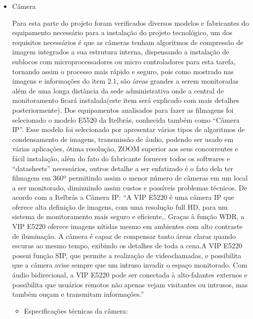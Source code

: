 \begin{itemize}
	\item Câmera
	
	Para esta parte do projeto foram verificados diversos modelos e fabricantes do equipamento necessário para a instalação do projeto tecnológico, um dos requisitos necessários é que as câmeras tenham algoritmos de compressão de imagem integrados a sua estrutura interna, dispensando a instalação de sublocos com microprocessadores ou micro controladores para esta tarefa, tornando assim o processo mais rápido e seguro, pois como  mostrado  nas imagens e informações do item 2.1, são áreas grandes a serem monitoradas além de uma longa distância da sede administrativa onde a central de monitoramento ficará instalada(este item será explicado com mais detalhes posteriormente). Dos equipamentos analisados para fazer as filmagens foi selecionado o modelo E5520 da Itelbrás, conhecida também como “Câmera IP”. Esse modelo foi selecionado  por apresentar  vários tipos de algoritmos de condensamento de imagens, transmissão de áudio, podendo ser usado em várias aplicações, ótima resolução, ZOOM superior aos seus concorrentes e fácil instalação, além do fato do fabricante fornecer todos os softwares e “datasheets” necessários, outros detalhe a ser enfatizado é o fato dela ter filmagem em 360º permitindo assim o menor número de câmeras em um local a ser monitorado, diminuindo assim custos e possíveis problemas técnicos. De acordo com a Itelbrás  a Câmera IP:
	“A VIP E5220 é uma câmera IP que oferece alta definição de imagens, com uma resolução full HD, para um sistema de monitoramento mais seguro e eficiente,. Graças à função WDR, a VIP E5220 oferece imagens nítidas mesmo em ambientes com alto contraste de iluminação. A câmera é capaz de compensar tanto áreas claras quando escuras ao mesmo tempo, exibindo os detalhes de toda a cena.A VIP E5220 possui função SIP, que permite a realização de videochamadas, e possibilita que a câmera avise sempre que um intruso invadir o espaço monitorado. Com áudio bidirecional, a VIP E5220 pode ser conectada à alto-falantes externos e possibilita que usuários remotos não apenas vejam visitantes ou intrusos, mas também ouçam e transmitam informações.”
	
	\begin{itemize}
		\item Especificações técnicas da câmera:
		

\end{itemize}
\end{itemize}
